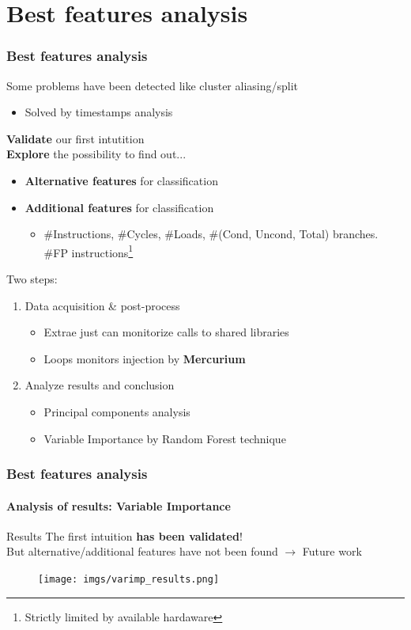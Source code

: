 \documentclass{beamer}
\begin{document}
\section{Best features analysis}
\begin{frame}
\frametitle{Best features analysis}
Some problems have been detected like cluster aliasing/split
\begin{itemize}
	\item Solved by timestamps analysis
\end{itemize}
\textbf{Validate} our first intutition \\
\textbf{Explore} the possibility to find out...\\
\begin{itemize}
	\item \textbf{Alternative features} for classification
	\item \textbf{Additional features} for classification
	\begin{itemize}
		\item \#Instructions, \#Cycles, \#Loads, \#(Cond, Uncond, Total) branches. \#FP instructions\footnote{Strictly limited by available hardaware}
	\end{itemize}
\end{itemize}
\pause
Two steps:
\begin{enumerate}
	\item Data acquisition \& post-process
	\begin{itemize}
		\item Extrae just can monitorize calls to shared libraries
		\item Loops monitors injection by \textbf{Mercurium}
	\end{itemize}
	\item Analyze results and conclusion
	\begin{itemize}
		\item Principal components analysis
		\item Variable Importance by Random Forest technique
	\end{itemize}
\end{enumerate}
\end{frame}

\begin{frame}
\frametitle{Best features analysis}
\framesubtitle{Analysis of results: \textbf{Variable Importance}}
\begin{block}{Results}
	The first intuition \textbf{has been validated}!\\
	But alternative/additional features have not been found $\rightarrow$ Future work
\end{block}
\begin{figure}
	\texttt{[image: imgs/varimp\_results.png]}
\end{figure}
\end{frame}
\end{document}

